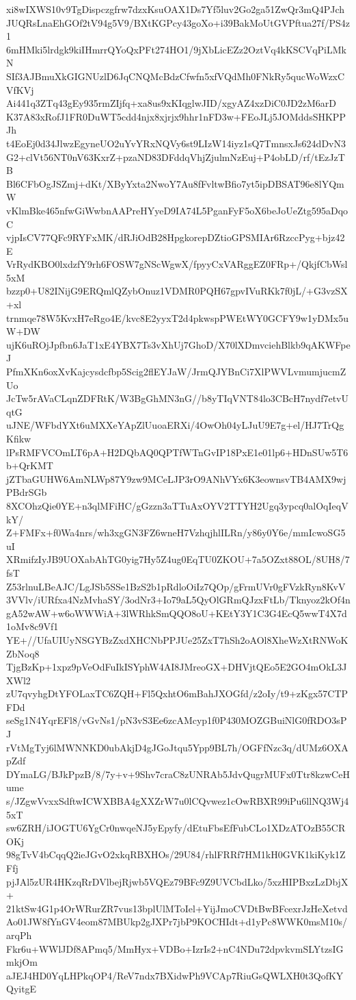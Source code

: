 xi8wIXWS10v9TgDispczgfrw7dzxKsuOAX1Ds7Yf5luv2Go2ga51ZwQr3mQ4PJch
JUQRsLnaEhGOf2tV94g5V9/BXtKGPcy43goXo+i39BakMoUtGVPftua27f/PS4z1
6mHMki5lrdgk9kiIHmrrQYoQxPFt274HO1/9jXbLicEZz2OztVq4kKSCVqPiLMkN
SIf3AJBmuXkGIGNUzlD6JqCNQMcBdzCfwfn5xfVQdMh0FNkRy5qucWoWzxCVfKVj
Ai441q3ZTq43gEy935rmZIjfq+xa8us9xKIqglwJID/xgyAZ4xzDiC0JD2zM6arD
K37A83xRofJ1FR0DuWT5cdd4njx8xjrjx9hhr1nFD3w+FEoJLj5JOMddsSHKPPJh
t4EoEj0d34JlwzEgyneUO2uYvYRxNQVy6st9LIzW14iyz1sQ7TmnsxJs624dDvN3
G2+clVt56NT0nV63KxrZ+pzaND83DFddqVhjZjulmNzEuj+P4obLD/rf/tEzJzTB
Bl6CFbOgJSZmj+dKt/XByYxta2NwoY7Au8fFvltwBfio7yt5ipDBSAT96e8lYQmW
vKlmBke465nfwGiWwbnAAPreHYyeD9IA74L5PganFyF5oX6beJoUeZtg595aDqoC
vjpIsCV77QFc9RYFxMK/dRJiOdB28HpgkorepDZtioGPSMIAr6RzccPyg+bjz42E
VrRydKBO0lxdzfY9rh6FOSW7gNScWgwX/fpyyCxVARggEZ0FRp+/QkjfCbWsl5xM
bzzp0+U82INijG9ERQmlQZybOnuz1VDMR0PQH67gpvIVuRKk7f0jL/+G3vzSX+xl
trnmqe78W5KvxH7eRgo4E/kvc8E2yyxT2d4pkwspPWEtWY0GCFY9w1yDMx5uW+DW
ujK6uROjJpfbn6JaT1xE4YBX7Ts3vXhUj7GhoD/X70lXDmvciehBlkb9qAKWFpeJ
PfmXKn6oxXvKajcysdcfbp5Scig2flEYJaW/JrmQJYBnCi7XlPWVLvmumjucmZUo
JcTw5rAVaCLqnZDFRtK/W3BgGhMN3nG//b8yTIqVNT84lo3CBcH7nydf7etvUqtG
uJNE/WFbdYXt6uMXXeYApZlUuoaERXi/4OwOh04yLJuU9E7g+el/HJ7TrQgKfikw
lPsRMFVCOmLT6pA+H2DQbAQ0QPTfWTnGvIP18PxE1e01lp6+HDnSUw5T6b+QrKMT
jZTbaGUHW6AmNLWp87Y9zw9MCeLJP3rO9ANhVYx6K3eownsvTB4AMX9wjPBdrSGb
8XCOhzQie0YE+n3qlMFiHC/gGzzn3aTTuAxOYV2TTYH2Ugq3ypcq0alOqIeqVkY/
Z+FMFx+f0Wa4nrs/wh3xgGN3FZ6wneH7VzhqjhlILRn/y86y0Y6e/mmIcwoSG5uI
XRmifzIyJB9UOXabAhTG0yig7Hy5Z4ug0EqTU0ZKOU+7a5OZxt88OL/8UH8/7fsT
Z53rlnuLBeAJC/LgJSb5SSe1BzS2b1pRdloOiIz7QOp/gFrmUVr0gFVzkRyn8KvV
3VVlv/iURfxa4NzMvhaSY/3odNr3+Io79aL5QyOlGRmQJzxFtLb/Tknyoz2kOf4n
gA52wAW+w6oWWWiA+3lWRhkSmQQO8oU+KEtY3Y1C3G4EcQ5wwT4X7d1oMv8c9Vf1
YE+//UfaUIUyNSGYBzZxdXHCNbPPJUe25ZxT7hSh2oAOl8XheWzXtRNWoKZbNoq8
TjgBzKp+1xpz9pVeOdFuIkISYphW4AI8JMreoGX+DHVjtQEo5E2GO4mOkL3JXWl2
zU7qvyhgDtYFOLaxTC6ZQH+Fl5QxhtO6mBahJXOGfd/z2oIy/t9+zKgx57CTPFDd
seSg1N4YqrEFl8/vGvNs1/pN3vS3Ee6zcAMcyp1f0P430MOZGBuiNlG0fRDO3sPJ
rVtMgTyj6lMWNNKD0ubAkjD4gJGoJtqu5Ypp9BL7h/OGFfNzc3q/dUMz6OXApZdf
DYmaLG/BJkPpzB/8/7y+v+9Shv7craC8zUNRAb5JdvQugrMUFx0Ttr8kzwCeHume
s/JZgwVvxxSdftwICWXBBA4gXXZrW7u0lCQvwez1cOwRBXR99iPu6llNQ3Wj45xT
sw6ZRH/iJOGTU6YgCr0nwqeNJ5yEpyfy/dEtuFbsEfFubCLo1XDzATOzB55CROKj
98gTvV4bCqqQ2ieJGvO2xkqRBXHOs/29U84/rhlFRRf7HM1kH0GVK1kiKyk1ZFfj
pjJAl5zUR4HKzqRrDVlbejRjwb5VQEz79BFc9Z9UVCbdLko/5xzHIPBxzLzDbjX+
21ktSw4G1p4OrWRurZR7vus13bplUlMToIel+YijJmoCVDtBwBFcexrJzHeXetvd
Ao01JW8fYnGV4eom87MBUkp2gJXPr7jbP9KOCHIdt+d1yPc8WWK0msM10s/arqPh
Fkr6u+WWlJDf8APmq5/MmHyx+VDBo+IzrIs2+nC4NDu72dpvkvmSLYtzsIGmkjOm
aJEJ4HD0YqLHPkqOP4/ReV7ndx7BXidwPh9VCAp7RiuGsQWLXH0t3QofKYQyitgE
